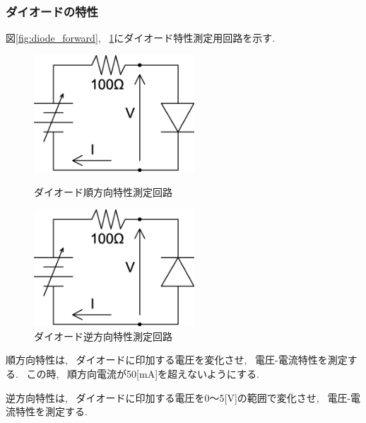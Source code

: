 \documentclass[uplatex,dvipdfmx,a4paper,js=standard, titlepage]{bxjsarticle}
\begin{document}
        \subsubsection{ダイオードの特性}
            図\ref{fig:diode_forward}, ~\ref{fig:diode_reverse}にダイオード特性測定用回路を示す.
            \begin{figure}[ht]
                \begin{minipage}{0.5\hsize}
                    \begin{center}
                        \includegraphics[width=6cm]{images/diode_forward.eps}
                        \caption{ダイオード順方向特性測定回路}
                        \label{fig:diode_forward}
                    \end{center}
                \end{minipage}
                \begin{minipage}{0.5\hsize}
                    \begin{center}
                        \includegraphics[width=6cm]{images/diode_reverse.eps}
                        \caption{ダイオード逆方向特性測定回路}
                        \label{fig:diode_reverse}
                    \end{center}
                \end{minipage}
            \end{figure}

            順方向特性は, ~ダイオードに印加する電圧を変化させ, ~電圧-電流特性を測定する.
            ~この時, ~順方向電流が50[mA]を超えないようにする.

            逆方向特性は, ~ダイオードに印加する電圧を0〜5[V]の範囲で変化させ, ~電圧-電流特性を測定する.
\end{document}
